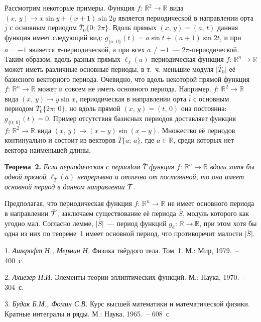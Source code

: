 Рассмотрим некоторые примеры. Функция $f:\,{\mathbb R}^{2}\to{\mathbb R}$ вида $(x,\,y)\to x\sin y+(x+1)\sin 2y$ является периодической в направлении орта $\bar{j}$ с основным периодом $\bar{T}_{0}\lbrace0;\,2\pi\rbrace$. Вдоль прямых $(x,\,y)=(a,\,t)$ данная функция имеет следующий вид: $g_{\lbrace a;\,0\rbrace}(t)=a\sin t+(a+1)\sin 2t$, и при $a=-1$ является $\pi$-периодической, а при всех $a\neq-1$~--- $2\pi$-периодической. Таким образом, вдоль разных прямых $\ell_{\bar{T}}(\bar{a})$ периодическая функция $f:\,{\mathbb R}^{n}\to{\mathbb R}$ может иметь различные основные периоды, в т.~ч. меньшие модуля $\vert\bar{T}_{0}\vert$ её базисного векторного периода. Очевидно, что вдоль некоторой прямой функция $f:\,{\mathbb R}^{n}\to{\mathbb R}$ может и совсем не иметь основного периода. Например, $f:\,{\mathbb R}^{2}\to{\mathbb R}$ вида $(x,\,y)\to y\sin x$, периодическая в направлении орта $\bar{i}$ с основным периодом $\bar{T}_{0}\lbrace 2\pi;\,0\rbrace$, но вдоль прямой $(x,\,y)=(t,\,0)$ она постоянна: $g_{\lbrace 0;\,0\rbrace}(t)=0$. Пример отсутствия базисных периодов доставляет функция $f:\,{\mathbb R}^{2}\to{\mathbb R}$ вида $(x,\,y)\to(x-y)\sin(x-y)$. Множество её периодов континуально и состоит из векторов $\bar{T}\lbrace a;\,a\rbrace$, где $a\in{\mathbb R}$, среди которых нет вектора наименьшей длины.

\textbf{Теорема~2.} {\it Если периодическая с периодом $\bar{T}$ функция $f:\,{\mathbb R}^{n}\to {\mathbb R}$ вдоль хотя бы одной прямой $\ell_{\bar{T}}(\bar{a})$ непрерывна и отлична от постоянной, то она имеет основной период в данном направлении $\bar{{\cal T}}$.}

Предполагая, что периодическая функция $f:\,{\mathbb R}^{n}\to {\mathbb R}$ не имеет основного периода в направлении $\bar{{\cal T}}$, заключаем существование её периода $\bar{S}$, модуль которого как угодно мал. Согласно лемме, $\vert\bar{S}\vert$~--- период функций $g_{\bar{a}}:\,{\mathbb R}\to {\mathbb R}$, при этом хотя бы одна из них по теореме~1 имеет основной период, что противоречит малости $\vert\bar{S}\vert$.

\litlist

1. {\it Ашкрофт Н., Мермин Н.} Физика твёрдого тела. Том~1. М.: Мир, 1979.~-- 400~с.

2. {\it Ахиезер Н.И.} Элементы теории эллиптических функций. М.:  Наука, 1970.~-- 304~с.

3. {\it Будак Б.М., Фомин С.В.} Курс высшей математики и математической физики. Кратные интегралы и ряды. М.: Наука, 1965.~-- 608~с.
